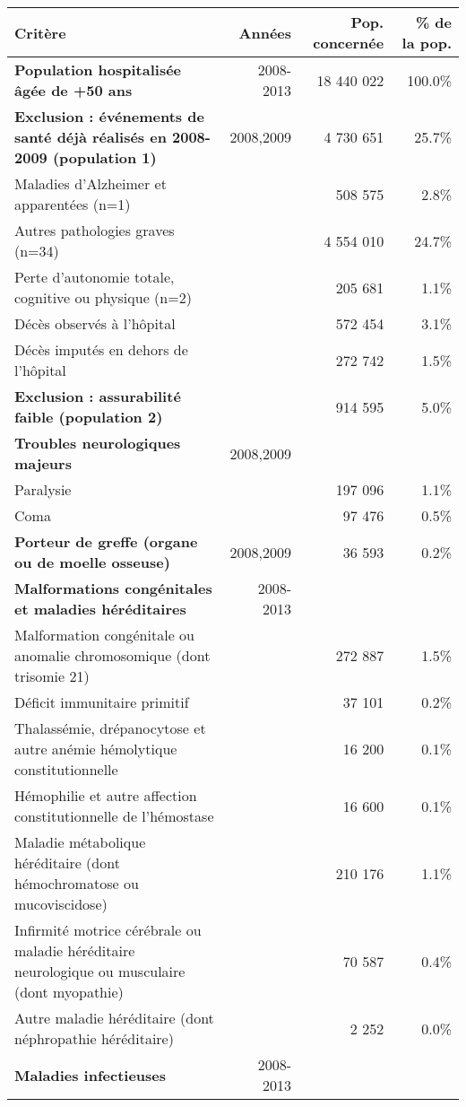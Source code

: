 \begin{tabular}{p{}rrr}
\toprule
Critère & Années & Pop. concernée & \% de la pop. \\ 
\midrule
\textbf{Population hospitalisée âgée de +50 ans} & 2008-2013 & 18 440 022 & 100.0\% \\ 
\textbf{Exclusion : événements de santé déjà réalisés en 2008-2009 (population 1)} & 2008,2009 & 4 730 651 & 25.7\% \\ 
Maladies d'Alzheimer et apparentées (n=1) &  & 508 575 & 2.8\% \\ 
Autres pathologies graves (n=34) &  & 4 554 010 & 24.7\% \\ 
Perte d'autonomie totale, cognitive ou physique (n=2) &  & 205 681 & 1.1\% \\ 
Décès observés à l'hôpital &  & 572 454 & 3.1\% \\ 
Décès imputés en dehors de l'hôpital &  & 272 742 & 1.5\% \\ 
\textbf{Exclusion : assurabilité faible (population 2)} &  & 914 595 & 5.0\% \\ 
\textbf{Troubles neurologiques majeurs} & 2008,2009 &  &  \\ 
Paralysie &  & 197 096 & 1.1\% \\ 
Coma &  & 97 476 & 0.5\% \\ 
\textbf{Porteur de greffe (organe ou de moelle osseuse)} & 2008,2009 & 36 593 & 0.2\% \\ 
\textbf{Malformations congénitales et maladies héréditaires} & 2008-2013 &  &  \\ 
Malformation congénitale ou anomalie chromosomique (dont trisomie 21) &  & 272 887 & 1.5\% \\ 
Déficit immunitaire primitif &  & 37 101 & 0.2\% \\ 
Thalassémie, drépanocytose et autre anémie hémolytique constitutionnelle &  & 16 200 & 0.1\% \\ 
Hémophilie et autre affection constitutionnelle de l'hémostase &  & 16 600 & 0.1\% \\ 
Maladie métabolique héréditaire (dont hémochromatose ou mucoviscidose) &  & 210 176 & 1.1\% \\ 
Infirmité motrice cérébrale ou maladie héréditaire neurologique ou musculaire (dont myopathie) &  & 70 587 & 0.4\% \\ 
Autre maladie héréditaire (dont néphropathie héréditaire) &  & 2 252 & 0.0\% \\ 
\textbf{Maladies infectieuses} & 2008-2013 &  &  \\ 

\end{tabular}
